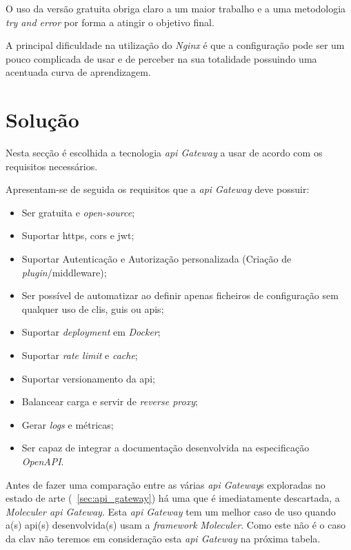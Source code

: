O uso da versão gratuita obriga claro a um maior trabalho e a uma metodologia \textit{try and error} por forma a atingir o objetivo final.

A principal dificuldade na utilização do \textit{Nginx} é que a configuração pode ser um pouco complicada de usar e de perceber na sua totalidade possuindo uma acentuada curva de aprendizagem.

\section{Solução}

Nesta secção é escolhida a tecnologia \textit{\acrshort{api} Gateway} a usar de acordo com os requisitos necessários.

Apresentam-se de seguida os requisitos que a \textit{\acrshort{api} Gateway} deve possuir:
\begin{itemize}
    \item Ser gratuita e \textit{open-source};
    \item Suportar \acrshort{https}, \acrshort{cors} e \acrshort{jwt};
    \item Suportar Autenticação e Autorização personalizada (Criação de \textit{plugin}/middleware);
    \item Ser possível de automatizar ao definir apenas ficheiros de configuração sem qualquer uso de \acrshort{cli}s, 
    \acrshort{gui}s ou \acrshort{api}s;
    \item Suportar \textit{deployment} em \textit{Docker};
    \item Suportar \textit{rate limit} e \textit{cache};
    \item Suportar versionamento da \acrshort{api};
    \item Balancear carga e servir de \textit{reverse proxy};
    \item Gerar \textit{logs} e métricas;
    \item Ser capaz de integrar a documentação desenvolvida na especificação \textit{OpenAPI}.
\end{itemize}

Antes de fazer uma comparação entre as várias \textit{\acrshort{api} Gateway}s exploradas no estado de arte 
(~\ref{sec:api_gateway}) há uma que é imediatamente descartada, a \textit{Moleculer \acrshort{api} Gateway}. 
Esta \textit{\acrshort{api} Gateway} tem um melhor caso de uso quando a(s) \acrshort{api}(s) desenvolvida(s) 
usam a \textit{framework} \textit{Moleculer}. Como este não é o caso da \acrshort{clav} não teremos em consideração 
esta \textit{\acrshort{api} Gateway} na próxima tabela.

